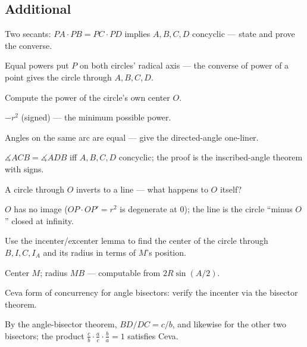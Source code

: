 \subsection*{Additional}
\begin{exercise}[easy]\label{exr:ga1}
Two secants: $PA\cdot PB = PC\cdot PD$ implies $A,B,C,D$ concyclic ---
state and prove the converse.
\end{exercise}
\begin{solution}
Equal powers put $P$ on both circles' radical axis --- the converse of
power of a point gives the circle through $A,B,C,D$.
\end{solution}
\begin{exercise}[easy]\label{exr:ga2}
Compute the power of the circle's own center $O$.
\end{exercise}
\begin{solution}
$-r^2$ (signed) --- the minimum possible power.
\end{solution}
\begin{exercise}[easy]\label{exr:ga3}
Angles on the same arc are equal --- give the directed-angle one-liner.
\end{exercise}
\begin{solution}
$\measuredangle ACB=\measuredangle ADB$ iff $A,B,C,D$ concyclic; the
proof is the inscribed-angle theorem with signs.
\end{solution}
\begin{exercise}[easy]\label{exr:ga4}
A circle through $O$ inverts to a line --- what happens to $O$ itself?
\end{exercise}
\begin{solution}
$O$ has no image ($OP\cdot OP'=r^2$ is degenerate at $0$); the line is
the circle ``minus $O$'' closed at infinity.
\end{solution}
\begin{exercise}[medium]\label{exr:ga5}
Use the incenter/excenter lemma to find the center of the circle through
$B,I,C,I_A$ and its radius in terms of $M$'s position.
\end{exercise}
\begin{solution}
Center $M$; radius $MB$ --- computable from $2R\sin(A/2)$.
\end{solution}
\begin{exercise}[medium]\label{exr:ga6}
Ceva form of concurrency for angle bisectors: verify the incenter via
the bisector theorem.
\end{exercise}
\begin{solution}
By the angle-bisector theorem, $BD/DC=c/b$, and likewise for the other
two bisectors; the product $\frac cb\cdot\frac ac\cdot\frac ba = 1$
satisfies Ceva.
\end{solution}
